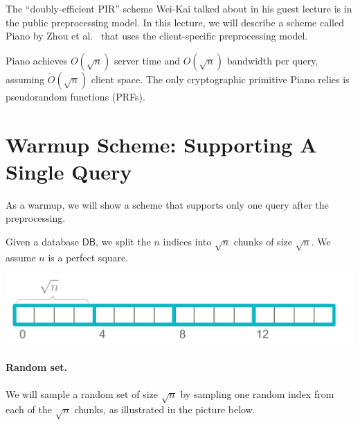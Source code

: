 The ``doubly-efficient PIR'' 
scheme Wei-Kai talked about in his guest lecture 
is in the public preprocessing model.
In this lecture, 
we will describe a scheme called Piano by Zhou et al.~\cite{zhou2023piano} 
that uses the client-specific preprocessing model.


Piano achieves $O(\sqrt{n})$ server time and $O(\sqrt{n})$ bandwidth per query, 
assuming $\widetilde{O}(\sqrt{n})$ client space. 
The only cryptographic primitive Piano relies is pseudorandom functions (PRFs).


\section{Warmup Scheme: Supporting A Single Query}
As a warmup, we will show a scheme that supports only one query after the preprocessing. 


Given a database $\mathsf{DB}$, we split the $n$ indices 
into $\sqrt{n}$ chunks of size $\sqrt{n}$.
We assume $n$ is a perfect square.

\begin{center}
    \includegraphics[scale=0.6]{chunks}
\end{center}

\paragraph{Random set.}
We will sample a random set 
of size $\sqrt{n}$ by sampling one random index from
each of the $\sqrt{n}$ chunks, as illustrated in the picture below. 


